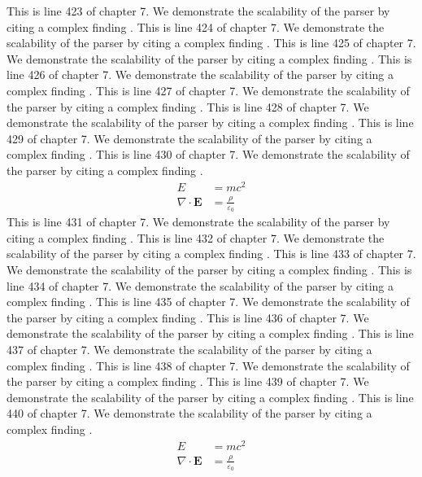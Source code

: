 This is line 423 of chapter 7. We demonstrate the scalability of the parser by citing a complex finding \cite{ref7_423}.
This is line 424 of chapter 7. We demonstrate the scalability of the parser by citing a complex finding \cite{ref7_424}.
This is line 425 of chapter 7. We demonstrate the scalability of the parser by citing a complex finding \cite{ref7_425}.
This is line 426 of chapter 7. We demonstrate the scalability of the parser by citing a complex finding \cite{ref7_426}.
This is line 427 of chapter 7. We demonstrate the scalability of the parser by citing a complex finding \cite{ref7_427}.
This is line 428 of chapter 7. We demonstrate the scalability of the parser by citing a complex finding \cite{ref7_428}.
This is line 429 of chapter 7. We demonstrate the scalability of the parser by citing a complex finding \cite{ref7_429}.
This is line 430 of chapter 7. We demonstrate the scalability of the parser by citing a complex finding \cite{ref7_430}.
\begin{align*}
  E &= mc^2 \\
  \nabla \cdot \mathbf{E} &= \frac{\rho}{\varepsilon_0}
\end{align*}
This is line 431 of chapter 7. We demonstrate the scalability of the parser by citing a complex finding \cite{ref7_431}.
This is line 432 of chapter 7. We demonstrate the scalability of the parser by citing a complex finding \cite{ref7_432}.
This is line 433 of chapter 7. We demonstrate the scalability of the parser by citing a complex finding \cite{ref7_433}.
This is line 434 of chapter 7. We demonstrate the scalability of the parser by citing a complex finding \cite{ref7_434}.
This is line 435 of chapter 7. We demonstrate the scalability of the parser by citing a complex finding \cite{ref7_435}.
This is line 436 of chapter 7. We demonstrate the scalability of the parser by citing a complex finding \cite{ref7_436}.
This is line 437 of chapter 7. We demonstrate the scalability of the parser by citing a complex finding \cite{ref7_437}.
This is line 438 of chapter 7. We demonstrate the scalability of the parser by citing a complex finding \cite{ref7_438}.
This is line 439 of chapter 7. We demonstrate the scalability of the parser by citing a complex finding \cite{ref7_439}.
This is line 440 of chapter 7. We demonstrate the scalability of the parser by citing a complex finding \cite{ref7_440}.
\begin{align*}
  E &= mc^2 \\
  \nabla \cdot \mathbf{E} &= \frac{\rho}{\varepsilon_0}
\end{align*}
